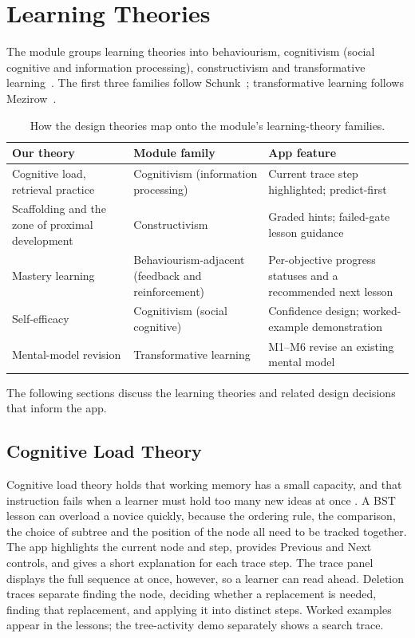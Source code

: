 \section{Learning Theories}\label{sec:id-theories}

The module groups learning theories into behaviourism, cognitivism (social
cognitive and information processing), constructivism and transformative
learning~\cite{Marshall2026LearningTheories}. The first three families follow
Schunk~\cite{schunk2012learning}; transformative learning follows
Mezirow~\cite{Mezirow1991}.
 
\begin{table}[htbp]
\centering
\small
\caption{How the design theories map onto the module's learning-theory families.}
\label{tab:theorymap}
\renewcommand{\arraystretch}{1.15}
\begin{tabularx}{\textwidth}{@{}>{\raggedright\arraybackslash}p{4.2cm} >{\raggedright\arraybackslash}p{4.4cm} >{\raggedright\arraybackslash}X@{}}
\toprule
Our theory & Module family & App feature \\
\midrule
Cognitive load, retrieval practice & Cognitivism (information processing) & Current trace step highlighted; predict-first \\
Scaffolding and the zone of proximal development & Constructivism & Graded hints; failed-gate lesson guidance \\
Mastery learning & Behaviourism-adjacent (feedback and reinforcement) & Per-objective progress statuses and a recommended next lesson \\
Self-efficacy & Cognitivism (social cognitive) & Confidence design; worked-example demonstration \\
Mental-model revision & Transformative learning & M1--M6 revise an existing mental model \\
\bottomrule
\end{tabularx}
\end{table}

The following sections discuss the learning theories and related design decisions that inform the app.

\subsection{Cognitive Load Theory}
Cognitive load theory holds that working memory has a small capacity, and that instruction fails when a learner must hold too many new ideas at once \cite{Sweller1988,Sweller1998}. A BST lesson can overload a novice quickly, because the ordering rule, the comparison, the choice of subtree and the position of the node all need to be tracked together. The app highlights the current node and step, provides Previous and Next controls, and gives a short explanation for each trace step. The trace panel displays the full sequence at once, however, so a learner can read ahead. Deletion traces separate finding the node, deciding whether a replacement is needed, finding that replacement, and applying it into distinct steps. Worked examples appear in the lessons; the tree-activity demo separately shows a search trace.

